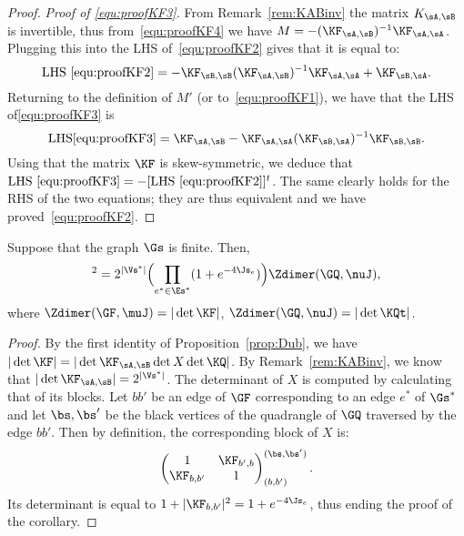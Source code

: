 \documentclass[a4paper,twoside,11pt]{article}
\begin{document}
\begin{proof}
\emph{Proof of \eqref{equ:proofKF3}.} From Remark~\ref{rem:KABinv} the matrix $K_{\sA,\sB}$ is invertible, thus from~\eqref{equ:proofKF4} we have 
$M=-(\KF_{\sA,\sB})^{-1}\KF_{\sA,\sA}$. Plugging this into the LHS of~\eqref{equ:proofKF2} gives that it is equal to:
\[
\mathrm{LHS}~\eqref{equ:proofKF2}=-\KF_{\sB,\sB}(\KF_{\sA,\sB})^{-1}\KF_{\sA,\sA}+\KF_{\sB,\sA}.
\]
Returning to the definition of $M'$ (or to~\eqref{equ:proofKF1}), we have that the LHS of\eqref{equ:proofKF3} is 
\[
\mathrm{LHS}\eqref{equ:proofKF3}=\KF_{\sA,\sB}-\KF_{\sA,\sA}(\KF_{\sB,\sA})^{-1}\KF_{\sB,\sB}.
\]
Using that the matrix $\KF$ is skew-symmetric, we deduce that 
$\mathrm{LHS}~\eqref{equ:proofKF3}=-[\mathrm{LHS}~\eqref{equ:proofKF2}]^t$.
The same clearly holds for the RHS of the two equations; they are thus equivalent and we have proved~\eqref{equ:proofKF2}. 
\end{proof}

\begin{cor}\label{cor:det_KF_KQ}
Suppose that the graph $\Gs$ is finite. Then,
\begin{equation*}
[\Zdimer(\GF,\muJ)]^2=2^{|\Vs^*|}\Bigl(\prod_{e^*\in\Es^*}(1+e^{-4\Js_e})\Bigr)\Zdimer(\GQ,\nuJ),
\end{equation*}
where $\Zdimer(\GF,\muJ)=|\det \KF|$, $\Zdimer(\GQ,\nuJ)=|\det \KQt|$.
\end{cor}
\begin{proof}
By the first identity of Proposition~\ref{prop:Dub}, we have $|\det\KF|=|\det\KF_{\sA,\sB} \det X \det \KQ|$. By Remark~\ref{rem:KABinv}, 
we know that $|\det \KF_{\sA,\sB}|=2^{|\Vs^*|}$. The determinant of $X$ is computed by calculating that of its blocks. 
Let $bb'$ be an edge of $\GF$ corresponding to an edge $e^*$ of $\Gs^*$ and let $\bs,\bs'$ be the black vertices of the quadrangle of 
$\GQ$ traversed by the edge $bb'$. Then by definition, the corresponding block of $X$ is:
\begin{equation*}
\begin{pmatrix}
1&\KF_{b',b}\\ 
\KF_{b,b'}&1
\end{pmatrix}_{(b,b')}^{(\bs,\bs')}.
\end{equation*}
Its determinant is equal to $1+|\KF_{b,b'}|^2=1+e^{-4\Js_e}$, thus ending the proof of the corollary.
\end{proof}



\end{document}
